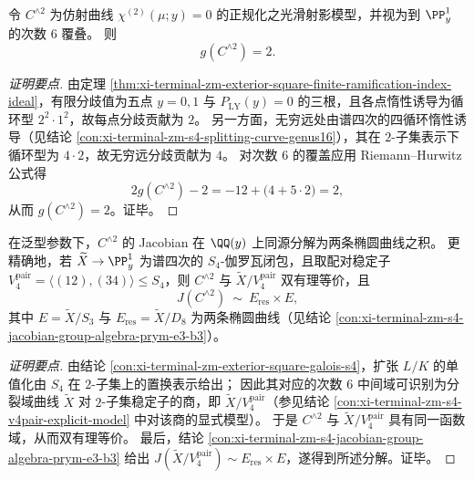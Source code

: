 \begin{theorem}[外二次谱曲线的正规化亏格]\label{thm:xi-terminal-zm-exterior-square-curve-genus2}
令 \(C^{\wedge 2}\) 为仿射曲线 \(\chi^{(2)}(\mu;y)=0\) 的正规化之光滑射影模型，并视为到 \(\PP^1_y\) 的次数 \(6\) 覆叠。
则
\[
g(C^{\wedge 2})=2.
\]
\end{theorem}
\begin{proof}[证明要点]
由定理 \ref{thm:xi-terminal-zm-exterior-square-finite-ramification-index-ideal}，有限分歧值为五点 \(y=0,1\) 与 \(P_{\mathrm{LY}}(y)=0\) 的三根，且各点惰性诱导为循环型 \(2^2\cdot 1^2\)，故每点分歧贡献为 \(2\)。
另一方面，无穷远处由谱四次的四循环惰性诱导（见结论 \ref{con:xi-terminal-zm-s4-splitting-curve-genus16}），其在 \(2\)-子集表示下循环型为 \(4\cdot 2\)，故无穷远分歧贡献为 \(4\)。
对次数 \(6\) 的覆盖应用 Riemann--Hurwitz 公式得
\[
2g(C^{\wedge 2})-2=-12+\bigl(4+5\cdot 2\bigr)=2,
\]
从而 \(g(C^{\wedge 2})=2\)。证毕。
\end{proof}

\begin{corollary}\label{cor:xi-terminal-zm-exterior-square-jacobian-splitting}
在泛型参数下，\(C^{\wedge 2}\) 的 Jacobian 在 \(\QQ(y)\) 上同源分解为两条椭圆曲线之积。
更精确地，若 \(\widetilde{X}\to\PP^1_y\) 为谱四次的 \(S_4\)-伽罗瓦闭包，且取配对稳定子 \(V_4^{\mathrm{pair}}=\langle(12),(34)\rangle\le S_4\)，则 \(C^{\wedge 2}\) 与 \(\widetilde{X}/V_4^{\mathrm{pair}}\) 双有理等价，且
\[
J(C^{\wedge 2})\ \sim\ E_{\mathrm{res}}\times E,
\]
其中 \(E=\widetilde{X}/S_3\) 与 \(E_{\mathrm{res}}=\widetilde{X}/D_8\) 为两条椭圆曲线（见结论 \ref{con:xi-terminal-zm-s4-jacobian-group-algebra-prym-e3-b3}）。
\end{corollary}
\begin{proof}[证明要点]
由结论 \ref{con:xi-terminal-zm-exterior-square-galois-s4}，扩张 \(L/K\) 的单值化由 \(S_4\) 在 \(2\)-子集上的置换表示给出；
因此其对应的次数 \(6\) 中间域可识别为分裂域曲线 \(\widetilde{X}\) 对 \(2\)-子集稳定子的商，即 \(\widetilde{X}/V_4^{\mathrm{pair}}\)（参见结论 \ref{con:xi-terminal-zm-s4-v4pair-explicit-model} 中对该商的显式模型）。
于是 \(C^{\wedge 2}\) 与 \(\widetilde{X}/V_4^{\mathrm{pair}}\) 具有同一函数域，从而双有理等价。
最后，结论 \ref{con:xi-terminal-zm-s4-jacobian-group-algebra-prym-e3-b3} 给出 \(J(\widetilde{X}/V_4^{\mathrm{pair}})\sim E_{\mathrm{res}}\times E\)，遂得到所述分解。证毕。
\end{proof}

